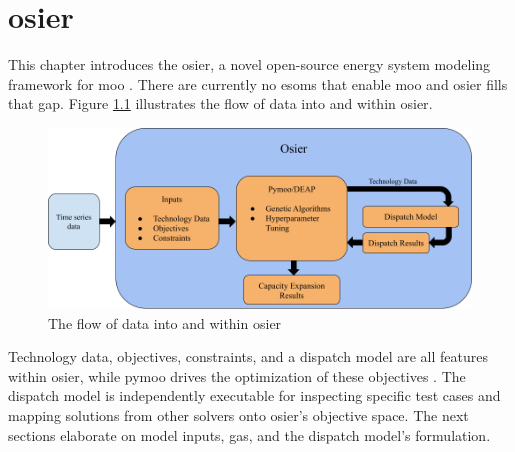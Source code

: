 \chapter{\acf{osier}}
\label{chapter:osier}

This chapter introduces the \acf{osier}, a novel open-source energy system modeling
framework for \acl{moo} \cite{dotson_osier_2024}. There are currently no
\acp{esom} that enable \ac{moo} and \ac{osier} fills that gap. Figure 
\ref{fig:osier_flow} illustrates the flow of data into and within \ac{osier}.

\begin{figure}[H]
    \centering
    \includegraphics[width=\columnwidth]{figures/osier_flow}
    \caption{The flow of data into and within \ac{osier}}
    \label{fig:osier_flow}
\end{figure}

Technology data, objectives, constraints, and a dispatch model are all features
within \ac{osier}, while \ac{pymoo} drives the optimization of these objectives \cite{blank_pymoo_2020}.
The dispatch model is independently executable for inspecting specific test
cases and mapping solutions from other solvers onto \ac{osier}'s objective
space. The next sections elaborate on model inputs, \acfp{ga}, and the dispatch model's 
formulation.






